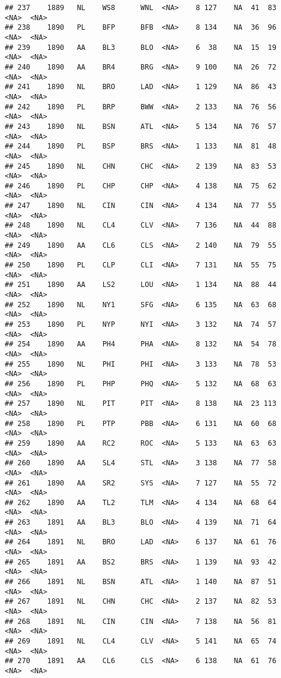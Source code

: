 \documentclass[]{article}
\begin{document}
\begin{verbatim}
## 237    1889   NL    WS8      WNL  <NA>    8 127    NA  41  83   <NA>  <NA>
## 238    1890   PL    BFP      BFB  <NA>    8 134    NA  36  96   <NA>  <NA>
## 239    1890   AA    BL3      BLO  <NA>    6  38    NA  15  19   <NA>  <NA>
## 240    1890   AA    BR4      BRG  <NA>    9 100    NA  26  72   <NA>  <NA>
## 241    1890   NL    BRO      LAD  <NA>    1 129    NA  86  43   <NA>  <NA>
## 242    1890   PL    BRP      BWW  <NA>    2 133    NA  76  56   <NA>  <NA>
## 243    1890   NL    BSN      ATL  <NA>    5 134    NA  76  57   <NA>  <NA>
## 244    1890   PL    BSP      BRS  <NA>    1 133    NA  81  48   <NA>  <NA>
## 245    1890   NL    CHN      CHC  <NA>    2 139    NA  83  53   <NA>  <NA>
## 246    1890   PL    CHP      CHP  <NA>    4 138    NA  75  62   <NA>  <NA>
## 247    1890   NL    CIN      CIN  <NA>    4 134    NA  77  55   <NA>  <NA>
## 248    1890   NL    CL4      CLV  <NA>    7 136    NA  44  88   <NA>  <NA>
## 249    1890   AA    CL6      CLS  <NA>    2 140    NA  79  55   <NA>  <NA>
## 250    1890   PL    CLP      CLI  <NA>    7 131    NA  55  75   <NA>  <NA>
## 251    1890   AA    LS2      LOU  <NA>    1 134    NA  88  44   <NA>  <NA>
## 252    1890   NL    NY1      SFG  <NA>    6 135    NA  63  68   <NA>  <NA>
## 253    1890   PL    NYP      NYI  <NA>    3 132    NA  74  57   <NA>  <NA>
## 254    1890   AA    PH4      PHA  <NA>    8 132    NA  54  78   <NA>  <NA>
## 255    1890   NL    PHI      PHI  <NA>    3 133    NA  78  53   <NA>  <NA>
## 256    1890   PL    PHP      PHQ  <NA>    5 132    NA  68  63   <NA>  <NA>
## 257    1890   NL    PIT      PIT  <NA>    8 138    NA  23 113   <NA>  <NA>
## 258    1890   PL    PTP      PBB  <NA>    6 131    NA  60  68   <NA>  <NA>
## 259    1890   AA    RC2      ROC  <NA>    5 133    NA  63  63   <NA>  <NA>
## 260    1890   AA    SL4      STL  <NA>    3 138    NA  77  58   <NA>  <NA>
## 261    1890   AA    SR2      SYS  <NA>    7 127    NA  55  72   <NA>  <NA>
## 262    1890   AA    TL2      TLM  <NA>    4 134    NA  68  64   <NA>  <NA>
## 263    1891   AA    BL3      BLO  <NA>    4 139    NA  71  64   <NA>  <NA>
## 264    1891   NL    BRO      LAD  <NA>    6 137    NA  61  76   <NA>  <NA>
## 265    1891   AA    BS2      BRS  <NA>    1 139    NA  93  42   <NA>  <NA>
## 266    1891   NL    BSN      ATL  <NA>    1 140    NA  87  51   <NA>  <NA>
## 267    1891   NL    CHN      CHC  <NA>    2 137    NA  82  53   <NA>  <NA>
## 268    1891   NL    CIN      CIN  <NA>    7 138    NA  56  81   <NA>  <NA>
## 269    1891   NL    CL4      CLV  <NA>    5 141    NA  65  74   <NA>  <NA>
## 270    1891   AA    CL6      CLS  <NA>    6 138    NA  61  76   <NA>  <NA>

\end{verbatim}
\end{document}
